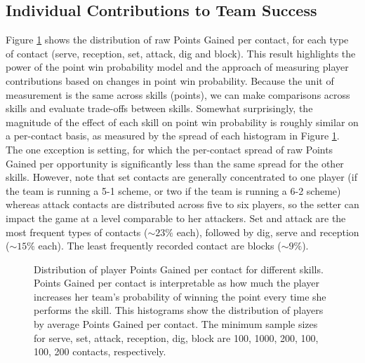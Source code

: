\documentclass[USenglish]{article}
\theoremstyle{dgthm}
\theoremstyle{dgdef}
\begin{document}
\subsection{Individual Contributions to Team Success}
\label{sec:points-gained}

Figure \ref{fig:points-gained-per-opportunity} shows the distribution of raw Points Gained per contact, for each type of contact (serve, reception, set, attack, dig and block). This result highlights the power of the point win probability model and the approach of measuring player contributions based on changes in point win probability. Because the unit of measurement is the same across skills (points), we can make comparisons across skills and evaluate trade-offs between skills. Somewhat surprisingly, the magnitude of the effect of each skill on point win probability is roughly similar on a per-contact basis, as measured by the spread of each histogram in Figure \ref{fig:points-gained-per-opportunity}. The one exception is setting, for which the per-contact spread of raw Points Gained per opportunity is significantly less than the same spread for the other skills. However, note that set contacts are generally concentrated to one player (if the team is running a 5-1 scheme, or two if the team is running a 6-2 scheme) whereas attack contacts are distributed across five to six players, so the setter can impact the game at a level comparable to her attackers. Set and attack are the most frequent types of contacts ($\sim23\%$ each), followed by dig, serve and reception ($\sim15\%$ each). The least frequently recorded contact are blocks ($\sim9\%$).

\begin{figure}
    \centering
    \caption{Distribution of player Points Gained per contact for different skills. Points Gained per contact is interpretable as how much the player increases her team's probability of winning the point every time she performs the skill. This histograms show the distribution of players by average Points Gained per contact. The minimum sample sizes for serve, set, attack, reception, dig, block are 100, 1000, 200, 100, 100, 200 contacts, respectively.}
    \label{fig:points-gained-per-opportunity}
\end{figure}
\end{document}
